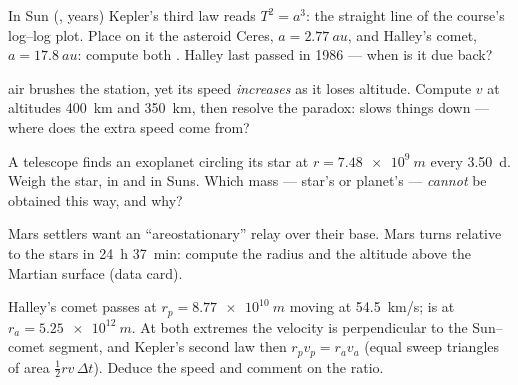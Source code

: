 \begin{exercise}[$\star\star$]\label{exo:g12:satellites-kepler:11}
In Sun  (, years) Kepler's third law reads
$T^2 = a^3$: the straight line of the course's log--log plot. Place
on it the asteroid Ceres, $a = \qty{2.77}{au}$, and Halley's comet,
$a = \qty{17.8}{au}$: compute both . Halley last passed
 in 1986 --- when is it due back?
\end{exercise}

\begin{exercise}[$\star\star\star$]\label{exo:g12:satellites-kepler:12}
 air brushes the station, yet its speed \emph{increases} as it
loses altitude. Compute $v$ at altitudes \qty{400}{km} and
\qty{350}{km}, then resolve the paradox:  slows things down
--- where does the extra speed come from?
\end{exercise}

\begin{exercise}[$\star\star\star$]\label{exo:g12:satellites-kepler:13}
A telescope finds an exoplanet circling its star at
$r = \qty{7.48e9}{m}$ every \qty{3.50}{d}. Weigh the star, in
 and in Suns. Which mass --- star's or planet's ---
\emph{cannot} be obtained this way, and why?
\end{exercise}

\begin{exercise}[$\star\star\star$]\label{exo:g12:satellites-kepler:14}
Mars settlers want an ``areostationary'' relay over their base.
Mars turns relative to the stars in \qty{24}{h} \qty{37}{min}:
compute the  radius and the altitude above the Martian
surface (data card).
\end{exercise}

\begin{exercise}[$\star\star\star$]\label{exo:g12:satellites-kepler:15}
Halley's comet passes  at $r_p = \qty{8.77e10}{m}$ moving
at \qty{54.5}{km/s};  is at $r_a = \qty{5.25e12}{m}$. At
both extremes the velocity is perpendicular to the Sun--comet
segment, and Kepler's second law then  $r_p v_p = r_a v_a$
(equal sweep triangles of area $\tfrac12 r v\,\Delta t$). Deduce the
 speed and comment on the ratio.
\end{exercise}

